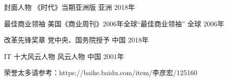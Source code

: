 



\begin{cvhonors}

  \cvhonor
    {封面人物} %
    {《时代》当期亚洲版} %
    {亚洲} %
    {2018年} %


  \cvhonor
    {最佳商业领袖} %
    {美国《商业周刊》2006年全球“最佳商业领袖”} %
    {全球} %
    {2006年} %


\end{cvhonors}




\begin{cvhonors}

  \cvhonor
    {改革先锋奖章} %
    {党中央、国务院授予} %
    {中国} %
    {2018年} %


  \cvhonor
    {IT 十大风云人物} %
    {风云人物} %
    {中国} %
    {2001年} %

\end{cvhonors}

{荣誉太多请参考：https://baike.baidu.com/item/李彦宏/125160}
\\

